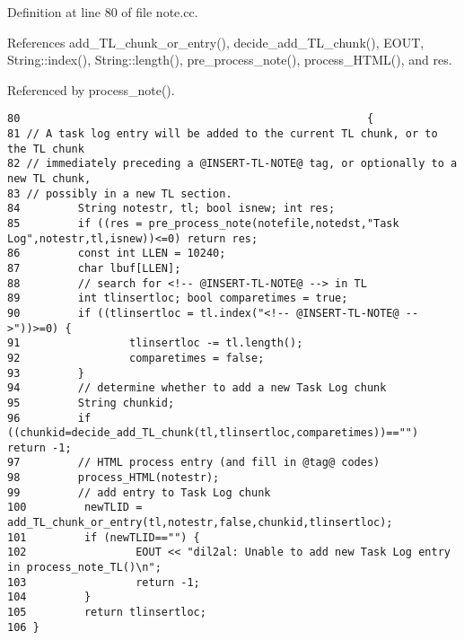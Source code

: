 Definition at line 80 of file note.cc.

References add\_\-TL\_\-chunk\_\-or\_\-entry(), decide\_\-add\_\-TL\_\-chunk(), EOUT, String::index(), String::length(), pre\_\-process\_\-note(), process\_\-HTML(), and res.

Referenced by process\_\-note().



\footnotesize\begin{verbatim}80                                                      {
81 // A task log entry will be added to the current TL chunk, or to the TL chunk
82 // immediately preceding a @INSERT-TL-NOTE@ tag, or optionally to a new TL chunk,
83 // possibly in a new TL section.
84         String notestr, tl; bool isnew; int res;
85         if ((res = pre_process_note(notefile,notedst,"Task Log",notestr,tl,isnew))<=0) return res;
86         const int LLEN = 10240;
87         char lbuf[LLEN];
88         // search for <!-- @INSERT-TL-NOTE@ --> in TL
89         int tlinsertloc; bool comparetimes = true;
90         if ((tlinsertloc = tl.index("<!-- @INSERT-TL-NOTE@ -->"))>=0) {
91                 tlinsertloc -= tl.length();
92                 comparetimes = false;
93         }
94         // determine whether to add a new Task Log chunk
95         String chunkid;
96         if ((chunkid=decide_add_TL_chunk(tl,tlinsertloc,comparetimes))=="") return -1;
97         // HTML process entry (and fill in @tag@ codes)
98         process_HTML(notestr);
99         // add entry to Task Log chunk
100         newTLID = add_TL_chunk_or_entry(tl,notestr,false,chunkid,tlinsertloc);
101         if (newTLID=="") {
102                 EOUT << "dil2al: Unable to add new Task Log entry in process_note_TL()\n";
103                 return -1;
104         }
105         return tlinsertloc;
106 }
\end{verbatim}\normalsize 
